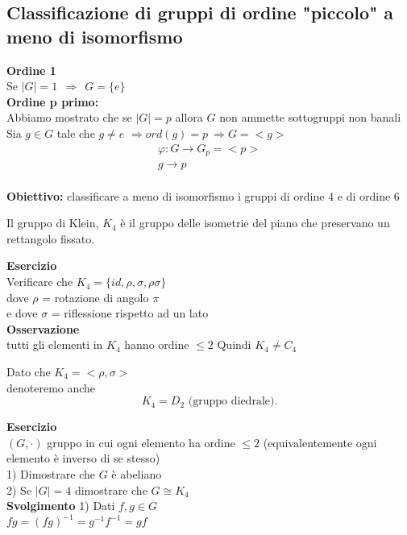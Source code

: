 \documentclass[12px]{article}
\begin{document}
{		\subsection{Classificazione di gruppi di ordine "piccolo" a meno di isomorfismo}
		\textbf{Ordine 1}\\
		Se $|G| = 1 \ \ \Rightarrow  \ \ G = \{e\}$\\
		\textbf{Ordine p primo:}\\
		Abbiamo mostrato che se $|G|=p$ allora  $G$ non ammette sottogruppi non banali\\
		Sia $g\in G$ tale che $g\neq e$
		$ \Rightarrow ord(g) = p \ \Rightarrow G = <g>$ \\
		\begin{gather*}
			\varphi: G \rightarrow G_p = <p>\\
			g \rightarrow p
		\end{gather*}\\
		\textbf{Obiettivo:} classificare a meno di isomorfismo i gruppi di ordine 4 e di ordine 6\\
		\newpage
		\begin{defi}[Klein,1884]
			Il gruppo di Klein, $K_4$ è il gruppo delle isometrie del piano che preservano un rettangolo fissato.
		\end{defi}
		\textbf{Esercizio}\\
		Verificare che $K_4 = \{id, \rho,\sigma, \rho\sigma\}$\\
		dove $\rho$ = rotazione di angolo $\pi$\\
		e dove  $\sigma$ = riflessione rispetto ad un lato\\
		\textbf{Osservazione}\\ tutti gli elementi in $K_4$ hanno ordine $\leq 2$ Quindi  $K_4\neq C_4$\\
		\begin{nota}
			Dato che $K_4 = <\rho,\sigma>$\\
			denoteremo anche
			\[
				K_4 = D_2 \text{ (gruppo diedrale)}
			.\] 
		\end{nota}
		\textbf{Esercizio}\\
		$(G,\cdot)$ gruppo in cui ogni elemento ha ordine $\leq 2$ (equivalentemente ogni elemento è inverso di se stesso)\\
		1) Dimostrare che $G$ è abeliano\\
		2) Se $|G| = 4$ dimostrare che  $G \cong K_4$\\
		\textbf{Svolgimento}
		1) Dati $f,g\in G$\\
		$fg = (fg)^{-1} = g^{-1}f^{-1} = gf$\\
}
\end{document}
